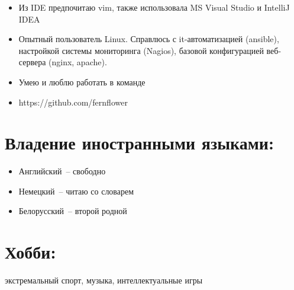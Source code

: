 \documentclass{res}
\begin{document}
\begin{resume}
\begin{itemize}
            \item Из IDE предпочитаю vim, также использовала MS Visual Studio и IntelliJ IDEA

            \item Опытный пользователь Linux. Справлюсь с it-автоматизацией (ansible), настройкой
                системы мониторинга (Nagios), базовой конфигурацией веб-сервера (nginx, apache).

            \item Умею и люблю работать в команде

            \item https://github.com/fernflower

        \end{itemize}

        \section{Владение иностранными языками:}
        \begin{itemize}
            \item Английский~-- свободно
            \item Немецкий~-- читаю со словарем
            \item Белорусский~-- второй родной
        \end{itemize}

    \section{Хобби:} экстремальный спорт, музыка, интеллектуальные игры
    
\end{resume}
\end{document}
